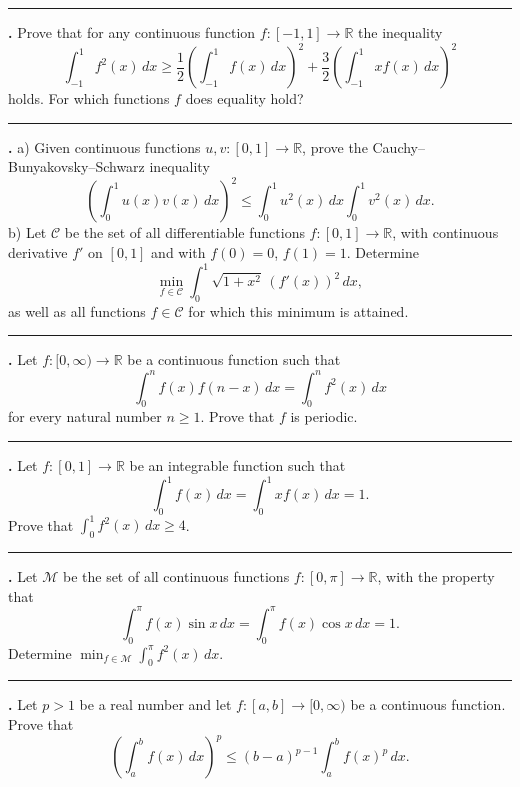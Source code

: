 \documentclass[11pt]{article}
\newcounter{probnum}
\newenvironment{problembox}{\par\noindent\rule{\linewidth}{0.5pt}\vspace{5pt}\par}{\vspace{2pt}}
\begin{document}
\begin{problembox}
\textbf{\theprobnum.} Prove that for any continuous function $f : [-1,1] \to \mathbb{R}$ the inequality
\[
\int_{-1}^{1} f^2(x)\,dx \ge \frac{1}{2}\left(\int_{-1}^{1} f(x)\,dx\right)^2 + \frac{3}{2}\left(\int_{-1}^{1} x f(x)\,dx\right)^2
\]
holds. For which functions $f$ does equality hold?
\end{problembox}

\begin{problembox}
\textbf{\theprobnum.} a) Given continuous functions $u, v : [0,1] \to \mathbb{R}$, prove the Cauchy--Bunyakovsky--Schwarz inequality
\[
\left(\int_0^1 u(x) v(x)\,dx\right)^2 \le \int_0^1 u^2(x)\,dx \int_0^1 v^2(x)\,dx.
\]
b) Let $\mathcal{C}$ be the set of all differentiable functions $f : [0,1] \to \mathbb{R}$, with continuous derivative $f'$ on $[0,1]$ and with $f(0)=0$, $f(1)=1$. Determine
\[
\min_{f \in \mathcal{C}} \int_0^1 \sqrt{1+x^2}\,(f'(x))^2\,dx,
\]
as well as all functions $f \in \mathcal{C}$ for which this minimum is attained.
\end{problembox}

\begin{problembox}
\textbf{\theprobnum.} Let $f : [0,\infty) \to \mathbb{R}$ be a continuous function such that
\[
\int_0^n f(x) f(n-x)\,dx = \int_0^n f^2(x)\,dx
\]
for every natural number $n \ge 1$. Prove that $f$ is periodic.
\end{problembox}

\begin{problembox}
\textbf{\theprobnum.} Let $f : [0,1] \to \mathbb{R}$ be an integrable function such that
\[
\int_0^1 f(x)\,dx = \int_0^1 x f(x)\,dx = 1.
\]
Prove that $\displaystyle\int_0^1 f^2(x)\,dx \ge 4$.
\end{problembox}

\begin{problembox}
\textbf{\theprobnum.} Let $\mathcal{M}$ be the set of all continuous functions $f : [0,\pi] \to \mathbb{R}$, with the property that
\[
\int_0^{\pi} f(x) \sin x\,dx = \int_0^{\pi} f(x) \cos x\,dx = 1.
\]
Determine $\displaystyle\min_{f \in \mathcal{M}} \int_0^{\pi} f^2(x)\,dx$.
\end{problembox}

\begin{problembox}
\textbf{\theprobnum.} Let $p > 1$ be a real number and let $f : [a,b] \to [0,\infty)$ be a continuous function. Prove that
\[
\left(\int_a^b f(x)\,dx\right)^p \le (b-a)^{p-1} \int_a^b f(x)^p\,dx.
\]
\end{problembox}
\end{document}
